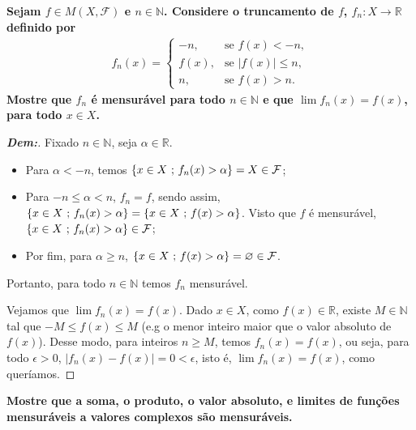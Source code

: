 \biglinend
\newpage
{}
\bigline 
\textbf{Sejam $f \in M(X, \mathcal F)$ e $n \in \mathbb N$. Considere o truncamento de $f$, 
$f_n: X \rightarrow \mathbb R$ definido por
\begin{align*}
  f_n(x) =\begin{cases}
    -n, &\text{se } f(x) < -n,\\
    f(x), &\text{se } |f(x)| \le n,\\
    n, &\text{se } f(x)>n.
  \end{cases}
\end{align*}
Mostre que $f_n$ é mensurável para todo $n \in \mathbb N$ e que $\lim f_n(x) = f(x)$, 
para todo $x \in X$.}
\begin{proof}[\textbf{Dem:}] Fixado $n \in \mathbb N$, seja $\alpha \in \mathbb R$. 

\begin{itemize}
  \item Para $\alpha < -n$, temos $\{x \in X\text{ ; }  f_n(x) > \alpha\}
  = X \in \mathcal F$;
  \item   Para $-n \le \alpha < n$, $f_n = f$, sendo assim, $\{x \in X\text{ ; }  f_n(x) > \alpha\} = 
    \{x \in X\text{ ; }  f(x) > \alpha\}$. Visto que $f$ é mensurável, 
    $\{x \in X\text{ ; }  f_n(x) > \alpha\} \in \mathcal F$;
  \item Por fim, para $\alpha \ge n$, $\{x \in X\text{ ; }  f(x) > \alpha\} = \varnothing \in \mathcal F$.
\end{itemize}
Portanto, para todo $n \in \mathbb N$ temos $f_n$ mensurável. 

Vejamos que $\lim f_n(x) = f(x)$.
Dado $x \in X$, como $f(x) \in \mathbb R$, existe $M \in \mathbb N$ tal que $-M\le f(x)\le M$ 
(e.g o menor inteiro maior que o valor absoluto de $f(x)$).
Desse modo, para inteiros $n \ge M$, temos $f_n(x) = f(x)$, 
ou seja, para todo $\epsilon > 0$, $|f_n(x) - f(x)| = 0 < \epsilon$, 
isto é, $\lim f_n (x) = f(x)$, como queríamos.
\end{proof}
\biglinend
\newpage 
{}
\bigline 
\textbf{Mostre que a soma, o produto, o valor absoluto, e limites de funções mensuráveis
a valores complexos são mensuráveis.}
